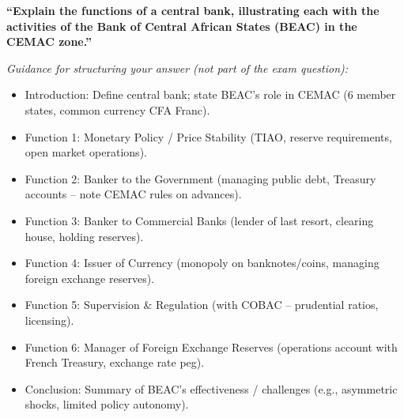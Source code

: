 \documentclass[11pt]{article}
\begin{document}
\begin{exercice}
\textbf{``Explain the functions of a central bank, illustrating each with the activities of the Bank of Central African States (BEAC) in the CEMAC zone.''}

\textit{Guidance for structuring your answer (not part of the exam question):}
\begin{itemize}
\item Introduction: Define central bank; state BEAC's role in CEMAC (6 member states, common currency CFA Franc).
\item Function 1: Monetary Policy / Price Stability (TIAO, reserve requirements, open market operations).
\item Function 2: Banker to the Government (managing public debt, Treasury accounts -- note CEMAC rules on advances).
\item Function 3: Banker to Commercial Banks (lender of last resort, clearing house, holding reserves).
\item Function 4: Issuer of Currency (monopoly on banknotes/coins, managing foreign exchange reserves).
\item Function 5: Supervision \& Regulation (with COBAC -- prudential ratios, licensing).
\item Function 6: Manager of Foreign Exchange Reserves (operations account with French Treasury, exchange rate peg).
\item Conclusion: Summary of BEAC's effectiveness / challenges (e.g., asymmetric shocks, limited policy autonomy).
\end{itemize}
\end{exercice}
\end{document}
